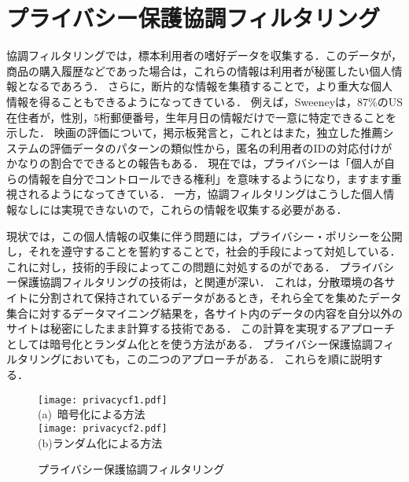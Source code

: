 \chapter{プライバシー保護協調フィルタリング}
\label{sec:privacycf}

協調フィルタリングでは，標本利用者の嗜好データを収集する．このデータが，商品の購入履歴などであった場合は，これらの情報は利用者が秘匿したい個人情報となるであろう．
さらに，断片的な情報を集積することで，より重大な個人情報を得ることもできるようになってきている．
例えば，Sweeneyは，87\%のUS在住者が，性別，5桁郵便番号，生年月日の情報だけで一意に特定できることを示した\cite{misc:079}．
映画の評価について，掲示板発言と，これとはまた，独立した推薦システムの評価データのパターンの類似性から，匿名の利用者のIDの対応付けがかなりの割合でできるとの報告もある\cite{sigir:06:05}．
現在では，プライバシーは「個人が自らの情報を自分でコントロールできる権利」\cite{jjsai:06:05}を意味するようになり，ますます重視されるようになってきている．
一方，協調フィルタリングはこうした個人情報なしには実現できないので，これらの情報を収集する必要がある．

現状では，この個人情報の収集に伴う問題には，プライバシー・ポリシーを公開し，それを遵守することを誓約することで，社会的手段によって対処している．
これに対し，技術的手段によってこの問題に対処するのがである．
プライバシー保護協調フィルタリングの技術は，\cite{eb:056:00,jjsai:09:01}と関連が深い．
これは，分散環境の各サイトに分割されて保持されているデータがあるとき，それら全てを集めたデータ集合に対するデータマイニング結果を，各サイト内のデータの内容を自分以外のサイトは秘密にしたまま計算する技術である．
この計算を実現するアプローチとしては暗号化\cite{lncs:00:04}とランダム化\cite{sigmod:00:03}とを使う方法がある．
プライバシー保護協調フィルタリングにおいても，この二つのアプローチがある．
これらを順に説明する．


\begin{figure}
\centering
\texttt{[image: privacycf1.pdf]}\\\smallskip
(a)~暗号化による方法\\\bigskip
\texttt{[image: privacycf2.pdf]}\\\smallskip
(b)ランダム化による方法
\caption{プライバシー保護協調フィルタリング}
\label{fig:privacycf}
\end{figure}

